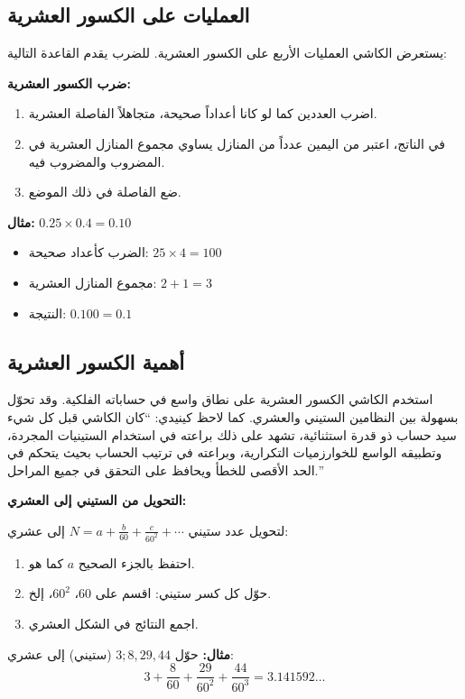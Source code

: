 \documentclass[11pt,a4paper]{book}
\newcommand{\ar}[1]{\arabicfont\beginR #1\endR}
\newenvironment{mathalgo}{%
  \par\vspace{0.3cm}
  \begin{framed}
  \setlength{\parindent}{0pt}
}{%
  \end{framed}
  \par\vspace{0.3cm}
}
\begin{document}
\subsection{\ar{العمليات على الكسور العشرية}}

\noindent\ar{يستعرض الكاشي العمليات الأربع على الكسور العشرية. للضرب يقدم القاعدة التالية:}

\begin{mathalgo}
\textbf{\ar{ضرب الكسور العشرية:}}
\begin{enumerate}[nosep]
  \item \ar{اضرب العددين كما لو كانا أعداداً صحيحة، متجاهلاً الفاصلة العشرية.}
  \item \ar{في الناتج، اعتبر من اليمين عدداً من المنازل يساوي مجموع المنازل العشرية في المضروب والمضروب فيه.}
  \item \ar{ضع الفاصلة في ذلك الموضع.}
\end{enumerate}

\vspace{0.3cm}
\noindent\textbf{\ar{مثال:}} $0.25 \times 0.4 = 0.10$
\begin{itemize}[nosep]
  \item \ar{الضرب كأعداد صحيحة:} $25 \times 4 = 100$
  \item \ar{مجموع المنازل العشرية:} $2 + 1 = 3$
  \item \ar{النتيجة:} $0.100 = 0.1$
\end{itemize}
\end{mathalgo}

\subsection{\ar{أهمية الكسور العشرية}}

\noindent\ar{استخدم الكاشي الكسور العشرية على نطاق واسع في حساباته الفلكية. وقد تحوّل بسهولة بين النظامين الستيني والعشري. كما لاحظ كينيدي: ``كان الكاشي قبل كل شيء سيد حساب ذو قدرة استثنائية، تشهد على ذلك براعته في استخدام الستينيات المجردة، وتطبيقه الواسع للخوارزميات التكرارية، وبراعته في ترتيب الحساب بحيث يتحكم في الحد الأقصى للخطأ ويحافظ على التحقق في جميع المراحل.''}

\begin{mathalgo}
\textbf{\ar{التحويل من الستيني إلى العشري:}}

\ar{لتحويل عدد ستيني} $N = a + \frac{b}{60} + \frac{c}{60^2} + \cdots$ \ar{إلى عشري:}
\begin{enumerate}[nosep]
  \item \ar{احتفظ بالجزء الصحيح $a$ كما هو.}
  \item \ar{حوّل كل كسر ستيني: اقسم على $60$، $60^2$، إلخ.}
  \item \ar{اجمع النتائج في الشكل العشري.}
\end{enumerate}

\vspace{0.3cm}
\noindent\textbf{\ar{مثال:}} \ar{حوّل} $3; 8, 29, 44$ \ar{(ستيني) إلى عشري:}
\[
3 + \frac{8}{60} + \frac{29}{60^2} + \frac{44}{60^3} = 3.141592\ldots
\]
\end{mathalgo}
\clearpage
\end{document}
